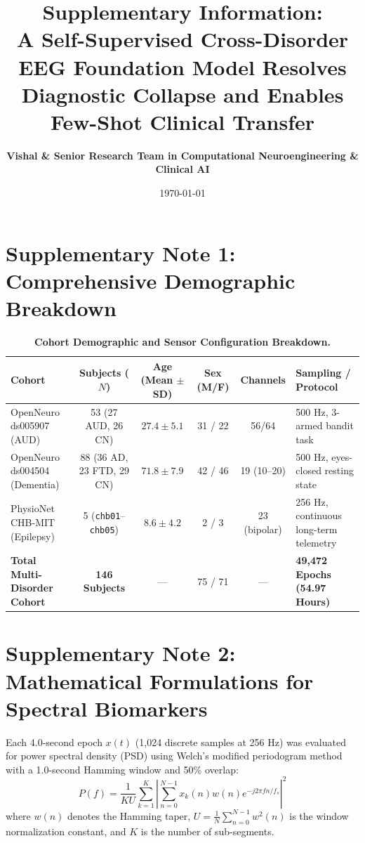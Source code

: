 \documentclass[11pt,a4paper]{article}
\title{\textbf{\Large Supplementary Information:\\A Self-Supervised Cross-Disorder EEG Foundation Model Resolves Diagnostic Collapse and Enables Few-Shot Clinical Transfer}}
\author{\textbf{Vishal \& Senior Research Team in Computational Neuroengineering \& Clinical AI}}
\affil{Department of Computational Neuroengineering and Biomedical Data Science, Clinical AI Division}
\date{\today}
\begin{document}
\maketitle

\section*{Supplementary Note 1: Comprehensive Demographic Breakdown}

\begin{table}[h]
\centering
\small
\caption{\textbf{Cohort Demographic and Sensor Configuration Breakdown.}}
\label{tab:supp_cohort}
\vspace{0.5em}
\begin{tabularx}{\textwidth}{lccccX}
\toprule
\textbf{Cohort} & \textbf{Subjects ($N$)} & \textbf{Age (Mean $\pm$ SD)} & \textbf{Sex (M/F)} & \textbf{Channels} & \textbf{Sampling / Protocol} \\
\midrule
OpenNeuro ds005907 (AUD) & 53 (27 AUD, 26 CN) & $27.4 \pm 5.1$ & 31 / 22 & 56/64 & 500 Hz, 3-armed bandit task \\
OpenNeuro ds004504 (Dementia) & 88 (36 AD, 23 FTD, 29 CN) & $71.8 \pm 7.9$ & 42 / 46 & 19 (10--20) & 500 Hz, eyes-closed resting state \\
PhysioNet CHB-MIT (Epilepsy) & 5 (\texttt{chb01}--\texttt{chb05}) & $8.6 \pm 4.2$ & 2 / 3 & 23 (bipolar) & 256 Hz, continuous long-term telemetry \\
\midrule
\textbf{Total Multi-Disorder Cohort} & \textbf{146 Subjects} & --- & 75 / 71 & --- & \textbf{49,472 Epochs (54.97 Hours)} \\
\bottomrule
\end{tabularx}
\end{table}

\section*{Supplementary Note 2: Mathematical Formulations for Spectral Biomarkers}

Each 4.0-second epoch $x(t)$ (1,024 discrete samples at 256 Hz) was evaluated for power spectral density (PSD) using Welch's modified periodogram method with a 1.0-second Hamming window and 50\% overlap:
\begin{equation}
P(f) = \frac{1}{K U} \sum_{k=1}^K \left| \sum_{n=0}^{N-1} x_k(n) w(n) e^{-j 2 \pi f n / f_s} \right|^2
\end{equation}
where $w(n)$ denotes the Hamming taper, $U = \frac{1}{N} \sum_{n=0}^{N-1} w^2(n)$ is the window normalization constant, and $K$ is the number of sub-segments.
\end{document}
